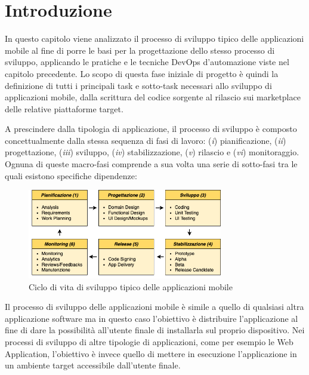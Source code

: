 
\section{Introduzione}
In questo capitolo viene analizzato il processo di sviluppo tipico delle applicazioni mobile al fine di porre le basi per la progettazione dello stesso processo di sviluppo,
applicando le pratiche e le tecniche DevOps d'automazione viste nel capitolo precedente. 
Lo scopo di questa fase iniziale di progetto è quindi la definizione di tutti i principali task e sotto-task necessari allo sviluppo di applicazioni mobile, 
dalla scrittura del codice sorgente al rilascio sui marketplace delle relative piattaforme target. 

A prescindere dalla tipologia di applicazione, il processo di sviluppo è composto concettualmente dalla stessa sequenza di fasi di lavoro: 
(\textit{i}) pianificazione, 
(\textit{ii}) progettazione, 
(\textit{iii}) sviluppo, 
(\textit{iv}) stabilizzazione, 
(\textit{v}) rilascio e (\textit{vi}) monitoraggio. 
Ognuna di queste macro-fasi comprende a sua volta una serie di sotto-fasi tra le quali esistono specifiche dipendenze:

\begin{figure}[H]
    \centering
    \includegraphics[width=0.76\textwidth]{img/sdlc.png}
    \caption{Ciclo di vita di sviluppo tipico delle applicazioni mobile}
    \label{sdlc-app-mobile-fig}
\end{figure}

Il processo di sviluppo delle applicazioni mobile è simile a quello di qualsiasi altra applicazione software ma in questo caso l'obiettivo è distribuire l'applicazione al fine di dare la possibilità all'utente finale di installarla sul proprio dispositivo. 
Nei processi di sviluppo di altre tipologie di applicazioni, 
come per esempio le Web Application, 
l'obiettivo è invece quello di mettere in esecuzione l'applicazione in un ambiente target accessibile dall'utente finale.

